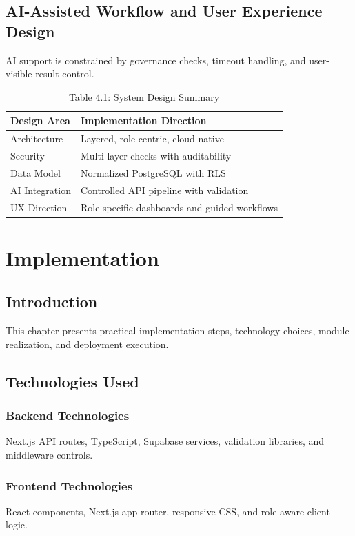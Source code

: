 \documentclass[12pt,a4paper]{article}
\begin{document}
\subsection{AI-Assisted Workflow and User Experience Design}
AI support is constrained by governance checks, timeout handling, and user-visible result control.

\begin{table}[H]
\centering
\caption{Table 4.1: System Design Summary}
\label{tab:design-summary}
\begin{tabularx}{0.92\textwidth}{|l|X|}
\hline
\textbf{Design Area} & \textbf{Implementation Direction} \\
\hline
Architecture & Layered, role-centric, cloud-native \\
\hline
Security & Multi-layer checks with auditability \\
\hline
Data Model & Normalized PostgreSQL with RLS \\
\hline
AI Integration & Controlled API pipeline with validation \\
\hline
UX Direction & Role-specific dashboards and guided workflows \\
\hline
\end{tabularx}
\end{table}

\section{Implementation}

\subsection{Introduction}
This chapter presents practical implementation steps, technology choices, module realization, and deployment execution.

\subsection{Technologies Used}

\subsubsection{Backend Technologies}
Next.js API routes, TypeScript, Supabase services, validation libraries, and middleware controls.

\subsubsection{Frontend Technologies}
React components, Next.js app router, responsive CSS, and role-aware client logic.
\end{document}
